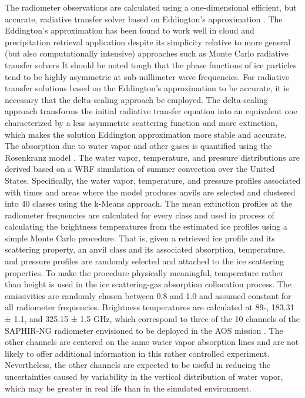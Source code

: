 \documentclass{ametsocV6.1}
\begin{document}
The radiometer observations are calculated using a one-dimensional efficient, but accurate, radiative transfer 
solver based on Eddington's approximation \citep{kummerow1993edd}. The Eddington's approximation has been found to work 
well in cloud and precipitation retrieval application despite its simplicity relative to more general (but also 
computationally intensive) approaches such as Monte Carlo radiative transfer solvers \citep{liu1996three} 
It should be noted tough that the phase functions of ice particles tend to be highly asymmetric at 
sub-millimeter wave frequencies. For radiative transfer solutions based on the Eddington's approximation to be 
accurate, it is necessary that the delta-scaling approach \citep{joseph1976delta} be employed. The delta-scaling 
approach transforms the initial radiative transfer equation into an equivalent one characterized by a less 
asymmetric scattering function and more extinction, which makes the solution Eddington approximation more stable 
and accurate. The absorption due to water vapor and other gases is quantified using the Rosenkranz model 
\citep{rosenkranz1998}.  The water vapor, temperature, and pressure distributions are derived based on a WRF 
simulation of summer convection over the United States.  Specifically, the water vapor, temperature, and 
pressure profiles associated with times and areas where the model produces anvils are selected and clustered 
into 40 classes using the k-Means approach.  The mean extinction profiles at the radiometer frequencies are 
calculated for every class 
and used in process of calculating the brightness temperatures from the estimated ice profiles using a simple 
Monte Carlo procedure.  That is, given a retrieved ice profile and its scattering property, an anvil class 
and its associated absorption, temperature, and pressure profiles are randomly selected and attached to the 
ice scattering properties. To make the procedure physically meaningful, temperature rather than height is 
used in the ice scattering-gas absorption collocation process.  The emissivities are randomly chosen between 
0.8 and 1.0 and assumed constant for all radiometer frequencies.  Brightness temperatures are calculated at 
89-, 183.31 ± 1.1, and 325.15 ± 1.5 GHz, which correspond to three of the 10 channels of the SAPHIR-NG 
radiometer envisioned to be deployed in the AOS mission \citep{brogniez2022time}.  The other channels are 
centered on the same water vapor absorption lines and are not likely to offer additional information in 
this rather controlled experiment. Nevertheless, the other channels are expected to be useful in reducing the 
uncertainties caused by variability in the vertical distribution of water vapor, which may be greater in 
real life than in the simulated environment. 
\end{document}
